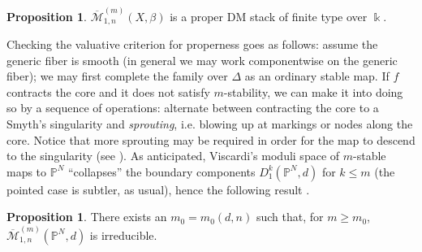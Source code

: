\documentclass[11pt]{amsart}
\newcommand{\oM}{\overline{\mathcal{M}}}
\newcommand{\PP}{\mathbb P}
\newcommand{\kk}{\Bbbk}
\newcommand{\dvr}{\Delta}
\theoremstyle{definition}
\newtheorem{prop}[thm]{Proposition}
\theoremstyle{definition}
\begin{document}
\begin{prop}\cite[Theorem 3.6]{VISC}
 $\oM^{(m)}_{1,n}(X,\beta)$ is a proper DM stack of finite type over $\kk$.
\end{prop}
Checking the valuative criterion for properness goes as follows: assume the generic fiber is smooth (in general we may work componentwise on the generic fiber); we may first complete the family over $\dvr$ as an ordinary stable map. If $f$ contracts the core and it does not satisfy $m$-stability, we can make it into doing so by a sequence of operations: alternate between contracting the core to a Smyth's singularity and \emph{sprouting}, i.e. blowing up at markings or nodes along the core. Notice that more sprouting may be required in order for the map to descend to the singularity (see \cite[Remark 2.6]{BCM}). As anticipated, Viscardi's moduli space of $m$-stable maps to $\PP^N$ ``collapses'' the boundary components $D^k_1(\PP^N,d)$ for $k\leq m$ (the pointed case is subtler, as usual), hence the following result \cite[Corollary 5.10]{VISC}.
\begin{prop}
 There exists an $m_0=m_0(d,n)$ such that, for $m\geq m_0$, $\oM^{(m)}_{1,n}(\PP^N,d)$ is irreducible.
\end{prop}
\end{document}
